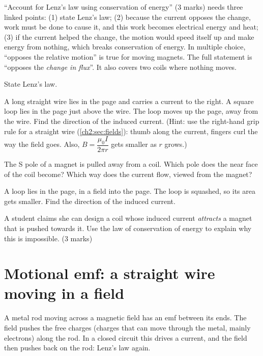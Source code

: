 \begin{examtip}
``Account for Lenz's law using conservation of energy'' (3 marks) needs three
linked points: (1) state Lenz's law; (2) because the current opposes the change,
work must be done to cause it, and this work becomes electrical energy and heat;
(3) if the current helped the change, the motion would speed itself up and make
energy from nothing, which breaks conservation of energy.
In multiple choice, ``opposes the relative motion'' is true for moving magnets.
The full statement is ``opposes the \emph{change in flux}''. It also covers two
coils where nothing moves.
\end{examtip}

\begin{quickcheck}[breakable]
  \item State Lenz's law.
  \item A long straight wire lies in the page and carries a current to the right.
        A square loop lies in the page just above the wire. The loop moves up the
        page, away from the wire. Find the direction of the induced current.
        (Hint: use the right-hand grip rule for a straight wire
        (\cref{ch2:sec:fields}): thumb along the current, fingers curl the way the
        field goes. Also, $B = \dfrac{\mu_0 I}{2\pi r}$ gets smaller as $r$
        grows.)\label{ch3:qc:wire}
  \item The S pole of a magnet is pulled away from a coil. Which pole does the near
        face of the coil become? Which way does the current flow, viewed from the
        magnet?
  \item A loop lies in the page, in a field into the page. The loop is squashed,
        so its area gets smaller. Find the direction of the induced current.
  \item A student claims she can design a coil whose induced current
        \emph{attracts} a magnet that is pushed towards it. Use the law of
        conservation of energy to explain why this is impossible. (3 marks)
\end{quickcheck}

\section{Motional emf: a straight wire moving in a field}\label{ch3:sec:motional}

\begin{bigidea}
A metal rod moving across a magnetic field has an emf between its ends. The
field pushes the free charges (charges that can move through the metal, mainly
electrons) along the rod. In a closed circuit this drives a
current, and the field then pushes back on the rod: Lenz's law again.
\end{bigidea}

